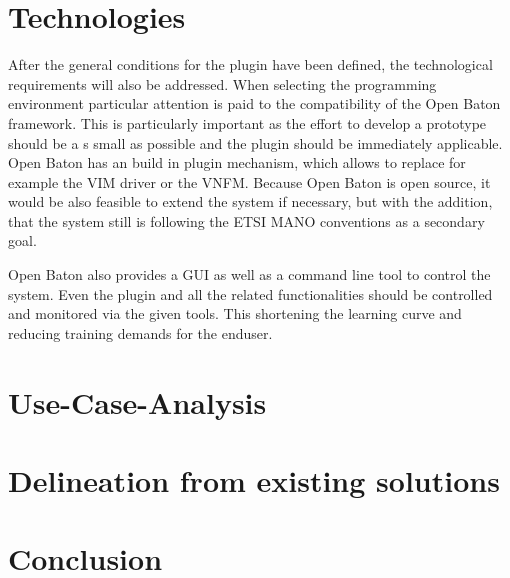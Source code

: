 \section{Technologies}
After the general conditions for the plugin have been defined, the technological requirements will also be addressed.
When selecting the programming environment particular attention is paid to the compatibility of the Open Baton framework.
This is particularly important as the effort to develop a prototype should be a s small as possible and the plugin should be immediately applicable.
Open Baton has an build in plugin mechanism, which allows to replace for example the \ac{VIM} driver or the \ac{VNFM}.
Because Open Baton is open source, it would be also feasible to extend the system if necessary, but with the addition, that the system still is following the \ac{ETSI} \ac{MANO} conventions as a secondary goal.

Open Baton also provides a \ac{GUI} as well as a command line tool to control the system.
Even the plugin and all the related functionalities should be controlled and monitored via the given tools.
This shortening the learning curve and reducing training demands for the enduser.




\section{Use-Case-Analysis}
\doit

\section{Delineation from existing solutions}
\doit


\section{Conclusion}
\doit
